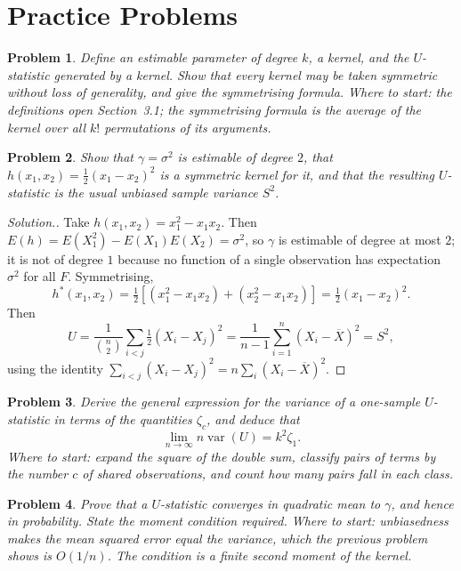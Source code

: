 \documentclass[12pt,a4paper]{report}
\theoremstyle{definition}
\theoremstyle{plain}
\newtheorem{problemx}{Problem}[section]
\newenvironment{problem}{\begin{problemx}}{\end{problemx}}
\newenvironment{solution}
  {\renewcommand{\qedsymbol}{}\begin{proof}[\textit{Solution}.]}
  {\end{proof}}
\begin{document}
\section{Practice Problems}

\begin{problem}
Define an estimable parameter of degree $k$, a kernel, and the $U$-statistic
generated by a kernel. Show that every kernel may be taken symmetric without
loss of generality, and give the symmetrising formula.
\emph{Where to start: the definitions open Section~3.1; the symmetrising formula is the average of the kernel over all $k!$ permutations of its arguments.}
\end{problem}

\begin{problem}
Show that $\gamma = \sigma^{2}$ is estimable of degree $2$, that
$h(x_1,x_2)=\tfrac12(x_1-x_2)^{2}$ is a symmetric kernel for it, and that the
resulting $U$-statistic is the usual unbiased sample variance $S^{2}$.
\end{problem}

\begin{solution}
Take $h(x_1,x_2)=x_1^{2}-x_1x_2$. Then
$E(h)=E(X_1^{2})-E(X_1)E(X_2)=\sigma^{2}$, so $\gamma$ is estimable of degree at
most $2$; it is not of degree $1$ because no function of a single observation
has expectation $\sigma^{2}$ for all $F$. Symmetrising,
$$h^{*}(x_1,x_2)=\tfrac12\left[(x_1^{2}-x_1x_2)+(x_2^{2}-x_1x_2)\right]
=\tfrac12(x_1-x_2)^{2}.$$
Then
$$U=\frac{1}{\binom{n}{2}}\sum_{i<j}\tfrac12(X_i-X_j)^{2}
=\frac{1}{n-1}\sum^{n}_{i=1}\left(X_i-\overline{X}\right)^{2}=S^{2},$$
using the identity $\sum_{i<j}(X_i-X_j)^{2}
= n\sum_i\left(X_i-\overline{X}\right)^{2}$.
\end{solution}

\begin{problem}
Derive the general expression for the variance of a one-sample $U$-statistic in
terms of the quantities $\zeta_c$, and deduce that
$$\lim_{n\to\infty} n\operatorname{var}\left(U\right) = k^{2}\zeta_1 .$$
\emph{Where to start: expand the square of the double sum, classify pairs of terms by the number $c$ of shared observations, and count how many pairs fall in each class.}
\end{problem}

\begin{problem}
Prove that a $U$-statistic converges in quadratic mean to $\gamma$, and hence in
probability. State the moment condition required.
\emph{Where to start: unbiasedness makes the mean squared error equal the variance, which the previous problem shows is $O(1/n)$. The condition is a finite second moment of the kernel.}
\end{problem}
\end{document}
